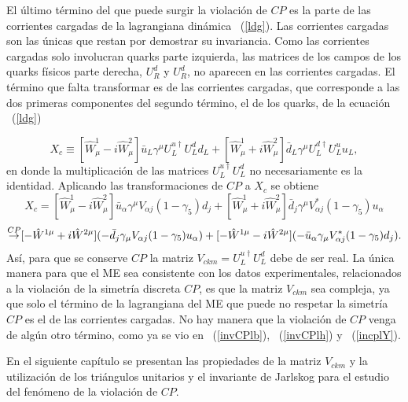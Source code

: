 El \'ultimo t\'ermino del que puede surgir la violaci\'on de $CP$ es la parte de
las corrientes cargadas de la lagrangiana din\'amica ~(\ref{ldg}). Las 
corrientes cargadas son las \'unicas que restan por demostrar su invariancia. 
Como las corrientes cargadas solo involucran quarks parte izquierda, las 
matrices de los campos de los quarks f\'isicos parte derecha, $U^d_R$ y $U^d_R$,
no aparecen en las corrientes cargadas. El t\'ermino que falta transformar es de
las corrientes cargadas, que corresponde a las dos primeras componentes del
segundo t\'ermino, el de los quarks, de la ecuaci\'on ~(\ref{ldg})

$$
X_c\equiv[\hat W^1_{\mu}-i\hat W^2_{\mu}]\bar u_L\gamma^{\mu}U^{u\dag}_LU^d_Ld_L
+[\hat W^1_{\mu}+i\hat W^2_{\mu}]\bar d_L\gamma^{\mu}U^{d\dag}_LU^u_Lu_L,
$$
en donde la multiplicaci\'on de las matrices $U^{u\dag}_LU^d_L$ no 
necesariamente es la identidad. Aplicando las transformaciones de $CP$ a $X_c$ 
se obtiene
$$
X_c=[\hat W^1_{\mu}-i\hat W^2_{\mu}]\bar u_{\alpha}\gamma^{\mu}V_{\alpha j}
(1-\gamma_5)d_j+[\hat W^1_{\mu}+i\hat W^2_{\mu}]\bar d_j\gamma^{\mu}
V^*_{\alpha j}(1-\gamma_5)u_{\alpha}
$$
$$
\mathop{\rightarrow}\limits^{CP}[-\hat W^{1\mu}+i\hat W^{2\mu}](-\bar d_j\gamma_{\mu}V_{\alpha j}
(1-\gamma_5)u_{\alpha})+[-\hat W^{1\mu}-i\hat W^{2\mu}](-\bar u_{\alpha}
\gamma_{\mu}V^*_{\alpha j}(1-\gamma_5)d_j).
$$
As\'i, para que se conserve $CP$ la matriz $V_{ckm}=U^{u\dag}_LU^{d}_L$ debe de 
ser real. La \'unica manera para que el ME sea consistente con los datos 
experimentales, relacionados a la violaci\'on de la simetr\'ia discreta $CP$, es
que la matriz $V_{ckm}$ sea compleja, ya que solo el t\'ermino de la lagrangiana
del ME que puede no respetar la simetr\'ia $CP$ es el de las corrientes 
cargadas. No hay manera que la violaci\'on de $CP$ venga de alg\'un otro 
t\'ermino, como ya se vio en ~(\ref{invCPlb}), ~(\ref{invCPlh}) y 
~(\ref{incplY}).

En el siguiente cap\'itulo se presentan las propiedades de la matriz $V_{ckm}$ y
la utilizaci\'on de los tri\'angulos unitarios y el invariante de Jarlskog para
el estudio del fen\'omeno de la violaci\'on de $CP$.




